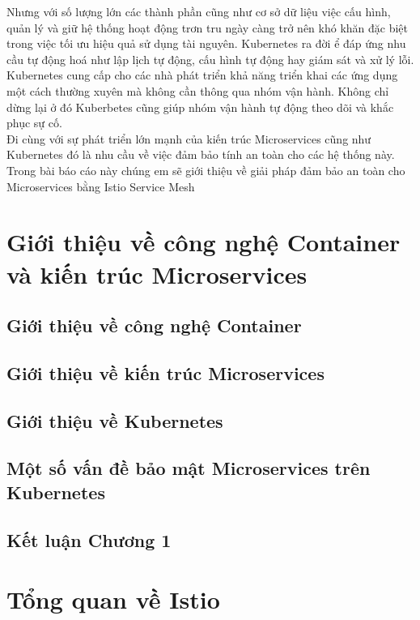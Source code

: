 \documentclass[12pt,a4paper]{report}
\begin{document}
	\hspace{1cm}Nhưng với số lượng lớn các thành phần cũng như cơ sở dữ liệu việc cấu hình, quản lý và giữ hệ thống hoạt động trơn tru ngày càng trở nên khó khăn đặc biệt trong việc tối ưu hiệu quả sử dụng tài nguyên. Kubernetes ra đời ể đáp ứng nhu cầu tự động hoá như lập lịch tự động, cấu hình tự động hay giám sát và xử lý lỗi.\\
	
	\hspace{1cm}Kubernetes cung cấp cho các nhà phát triển khả năng triển khai các ứng dụng một cách thường xuyên mà không cần thông qua nhóm vận hành. Không chỉ dừng lại ở đó Kuberbetes cũng giúp nhóm vận hành tự động theo dõi và khắc phục sự cố. \\
	
	\hspace{1cm}Đi cùng với sự phát triển lớn mạnh của kiến trúc Microservices cũng như Kubernetes đó là nhu cầu về việc đảm bảo tính an toàn cho các hệ thống này. Trong bài báo cáo này chúng em sẽ giới thiệu về giải pháp đảm bảo an toàn cho Microservices bằng Istio Service Mesh
	
	\chapter{Giới thiệu về công nghệ Container và kiến trúc Microservices}
		\section{Giới thiệu về công nghệ Container}
		\section{Giới thiệu về kiến trúc Microservices}
		\section{Giới thiệu về Kubernetes}
		\section{Một số vấn đề bảo mật Microservices trên Kubernetes}
		\section*{Kết luận Chương 1}
	
	\chapter{Tổng quan về Istio}
\end{document}
